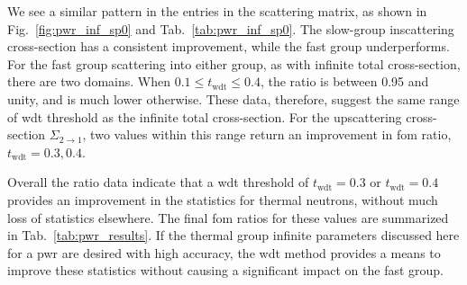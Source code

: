 We see a similar pattern in the entries in the scattering matrix, as
shown in Fig.~\ref{fig:pwr_inf_sp0} and
Tab.~\ref{tab:pwr_inf_sp0}. The slow-group inscattering cross-section
has a consistent improvement, while the fast group underperforms. For
the fast group scattering into either group, as with infinite total
cross-section, there are two domains. When
$0.1 \leq t_{\mathrm{wdt}} \leq 0.4$, the ratio is between 0.95 and
unity, and is much lower otherwise. These data, therefore, suggest the
same range of \gls{wdt} threshold as the infinite total
cross-section. For the upscattering cross-section $\Sigma_{2 \to 1}$,
two values within this range return an improvement in \gls{fom} ratio,
$t_\mathrm{wdt} = 0.3, 0.4$.

Overall the ratio data indicate that a \gls{wdt} threshold of
$t_{\mathrm{wdt}} = 0.3$ or $t_{\mathrm{wdt}} = 0.4$ provides an
improvement in the statistics for thermal neutrons, without much loss
of statistics elsewhere. The final \gls{fom} ratios for these values
are summarized in Tab.~\ref{tab:pwr_results}. If the thermal group
infinite parameters discussed here for a \gls{pwr} are desired with
high accuracy, the \gls{wdt} method provides a means to improve these
statistics without causing a significant impact on the fast group.

